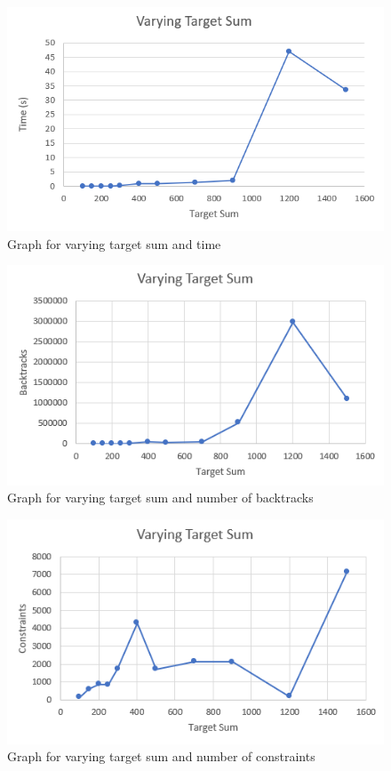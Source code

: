 \documentclass[runningheads]{llncs}
\begin{document}
\begin{figure}
    \centering
    \includegraphics[width=\textwidth]{graph_sum_time.png}
    \caption{Graph for varying target sum and time}
    \label{graphSumT}
\end{figure}

\begin{figure}
    \centering
    \includegraphics[width=\textwidth]{graph_sum_backs.png}
    \caption{Graph for varying target sum and number of backtracks}
    \label{graphSumB}
\end{figure}

\begin{figure}
    \centering
    \includegraphics[width=\textwidth]{graph_sum_consts.png}
    \caption{Graph for varying target sum and number of constraints}
    \label{graphSumC}
\end{figure}
\end{document}
